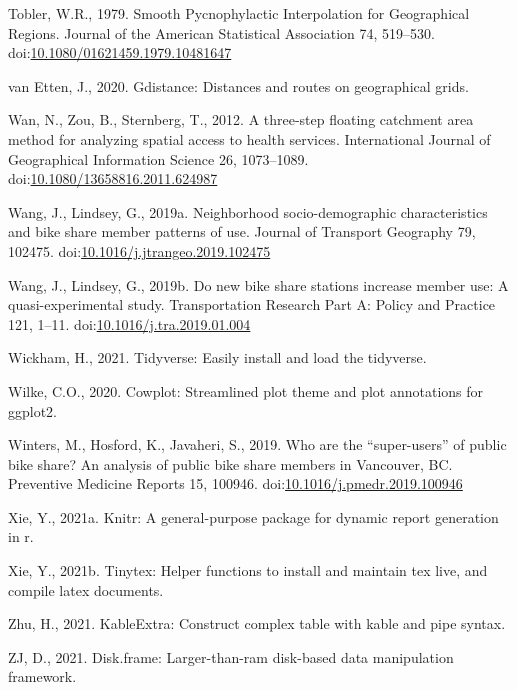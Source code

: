 \documentclass[]{elsarticle} %
\begin{document}
\leavevmode\hypertarget{ref-toblerSmoothPycnophylacticInterpolation1979}{}%
Tobler, W.R., 1979. Smooth Pycnophylactic Interpolation for Geographical
Regions. Journal of the American Statistical Association 74, 519--530.
doi:\href{https://doi.org/10.1080/01621459.1979.10481647}{10.1080/01621459.1979.10481647}

\leavevmode\hypertarget{ref-R-gdistance}{}%
van Etten, J., 2020. Gdistance: Distances and routes on geographical
grids.

\leavevmode\hypertarget{ref-wanThreestepFloatingCatchment2012}{}%
Wan, N., Zou, B., Sternberg, T., 2012. A three-step floating catchment
area method for analyzing spatial access to health services.
International Journal of Geographical Information Science 26,
1073--1089.
doi:\href{https://doi.org/10.1080/13658816.2011.624987}{10.1080/13658816.2011.624987}

\leavevmode\hypertarget{ref-wangNeighborhoodSociodemographicCharacteristics2019}{}%
Wang, J., Lindsey, G., 2019a. Neighborhood socio-demographic
characteristics and bike share member patterns of use. Journal of
Transport Geography 79, 102475.
doi:\href{https://doi.org/10.1016/j.jtrangeo.2019.102475}{10.1016/j.jtrangeo.2019.102475}

\leavevmode\hypertarget{ref-wangNewBikeShare2019}{}%
Wang, J., Lindsey, G., 2019b. Do new bike share stations increase member
use: A quasi-experimental study. Transportation Research Part A: Policy
and Practice 121, 1--11.
doi:\href{https://doi.org/10.1016/j.tra.2019.01.004}{10.1016/j.tra.2019.01.004}

\leavevmode\hypertarget{ref-R-tidyverse}{}%
Wickham, H., 2021. Tidyverse: Easily install and load the tidyverse.

\leavevmode\hypertarget{ref-R-cowplot}{}%
Wilke, C.O., 2020. Cowplot: Streamlined plot theme and plot annotations
for ggplot2.

\leavevmode\hypertarget{ref-wintersWhoAreSuperusers2019}{}%
Winters, M., Hosford, K., Javaheri, S., 2019. Who are the
``super-users'' of public bike share? An analysis of public bike share
members in Vancouver, BC. Preventive Medicine Reports 15, 100946.
doi:\href{https://doi.org/10.1016/j.pmedr.2019.100946}{10.1016/j.pmedr.2019.100946}

\leavevmode\hypertarget{ref-R-knitr}{}%
Xie, Y., 2021a. Knitr: A general-purpose package for dynamic report
generation in r.

\leavevmode\hypertarget{ref-R-tinytex}{}%
Xie, Y., 2021b. Tinytex: Helper functions to install and maintain tex
live, and compile latex documents.

\leavevmode\hypertarget{ref-R-kableExtra}{}%
Zhu, H., 2021. KableExtra: Construct complex table with kable and pipe
syntax.

\leavevmode\hypertarget{ref-R-disk.frame}{}%
ZJ, D., 2021. Disk.frame: Larger-than-ram disk-based data manipulation
framework.
\end{document}
